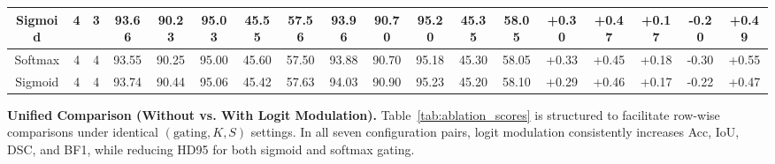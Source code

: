 \begin{table}[t]
{\begin{tabular}{@{}ccc|ccccc|ccccc|ccccc@{}}
Sigmoid & 4 & 3 & \cellcolor{SecondBestColor}\textcolor{SecondBestTextColor}{93.66} & 90.23 & \cellcolor{SecondBestColor}\textcolor{SecondBestTextColor}{95.03} & \cellcolor{SecondBestColor}\textcolor{SecondBestTextColor}{45.55} & \cellcolor{SecondBestColor}\textcolor{SecondBestTextColor}{57.56} & \cellcolor{SecondBestColor}\textcolor{SecondBestTextColor}{93.96} & \cellcolor{SecondBestColor}\textcolor{SecondBestTextColor}{90.70} & \cellcolor{SecondBestColor}\textcolor{SecondBestTextColor}{95.20} & \cellcolor{SecondBestColor}\textcolor{SecondBestTextColor}{45.35} & \cellcolor{SecondBestColor}\textcolor{SecondBestTextColor}{58.05} & \textcolor{BestTextColor}{+0.30} & \textcolor{BestTextColor}{+0.47} & \textcolor{BestTextColor}{+0.17} & \textcolor{BestTextColor}{-0.20} & \textcolor{BestTextColor}{+0.49} \\
\midrule
Softmax & 4 & 4 & 93.55 & \cellcolor{SecondBestColor}\textcolor{SecondBestTextColor}{90.25} & 95.00 & 45.60 & 57.50 & 93.88 & \cellcolor{SecondBestColor}\textcolor{SecondBestTextColor}{90.70} & 95.18 & 45.30 & \cellcolor{SecondBestColor}\textcolor{SecondBestTextColor}{58.05} & \textcolor{BestTextColor}{+0.33} & \textcolor{BestTextColor}{+0.45} & \textcolor{BestTextColor}{+0.18} & \textcolor{BestTextColor}{-0.30} & \textcolor{BestTextColor}{+0.55} \\
Sigmoid & 4 & 4 & \cellcolor{BestColor}\textcolor{BestTextColor}{93.74} & \cellcolor{BestColor}\textcolor{BestTextColor}{90.44} & \cellcolor{BestColor}\textcolor{BestTextColor}{95.06} & \cellcolor{BestColor}\textcolor{BestTextColor}{45.42} & \cellcolor{BestColor}\textcolor{BestTextColor}{57.63} & \cellcolor{BestColor}\textcolor{BestTextColor}{94.03} & \cellcolor{BestColor}\textcolor{BestTextColor}{90.90} & \cellcolor{BestColor}\textcolor{BestTextColor}{95.23} & \cellcolor{BestColor}\textcolor{BestTextColor}{45.20} & \cellcolor{BestColor}\textcolor{BestTextColor}{58.10} & \textcolor{BestTextColor}{+0.29} & \textcolor{BestTextColor}{+0.46} & \textcolor{BestTextColor}{+0.17} & \textcolor{BestTextColor}{-0.22} & \textcolor{BestTextColor}{+0.47} \\
\bottomrule
\end{tabular}%
}
\normalsize
\setlength{\tabcolsep}{6pt}
\end{table}

\noindent\textbf{Unified Comparison (Without vs. With Logit Modulation).} Table~\ref{tab:ablation_scores} is structured to facilitate row-wise comparisons under identical $(\text{gating}, K, S)$ settings. In all seven configuration pairs, logit modulation consistently increases Acc, IoU, DSC, and BF1, while reducing HD95 for both sigmoid and softmax gating.

